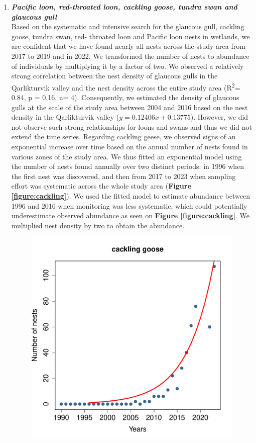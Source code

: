 \documentclass[a4paper,twoside,12pt]{article}
\begin{document}
        \begin{enumerate}[label=\alph*.]
                
     \item[] \textit{\textbf{Pacific loon, red-throated loon, cackling goose, tundra swan and glaucous gull}}   \\
Based on the systematic and intensive search for the glaucous gull, cackling goose, tundra swan, red- throated loon and Pacific loon nests in wetlands, we are confident that we have found nearly all nests across the study area from 2017 to 2019 and in 2022. We transformed the number of nests to abundance of individuals by multiplying it by a factor of two. 
We observed a relatively strong correlation between the nest density of glaucous gulls in the Qarlikturvik valley and the nest density across the entire study area (R\textsuperscript{2}= 0.84, p = 0.16, n= 4). Consequently, we estimated the density of glaucous gulls at the scale of the study area between 2004 and 2016 based on the nest density in the Qarlikturvik valley ($y = 0.12406x + 0.13775$). However, we did not observe such strong relationships for loons and swans and thus we did not extend the time series. Regarding cackling geese, we observed signs of an exponential increase over time based on the annual number of nests found in various zones of the study area. We thus fitted an exponential model using the number of nests found annually over two distinct periods: in 1996 when the first nest was discovered, and then from 2017 to 2023 when sampling effort was systematic across the whole study area (\textbf{Figure \ref{figure:cackling}}). We used the fitted model to estimate abundance between 1996 and 2016 when monitoring was less systematic, which could potentially underestimate observed abundance as seen on \textbf{Figure \ref{figure:cackling}}. We multiplied nest density by two to obtain the abundance. 
\begin{figure}[h]
\centering
\includegraphics[width=0.5\linewidth]{figures/cackling_goose_nest_exponential.pdf} 

\end{figure}
\end{enumerate}
\end{document}
